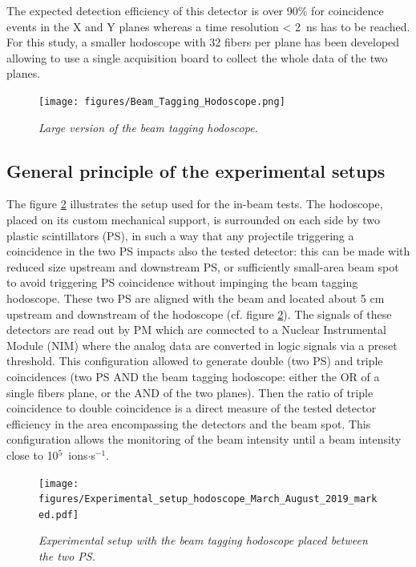 \documentclass[a4paper,11pt]{article}
\begin{document}
The expected detection efficiency of this detector is over 90\% for coincidence events in the X and Y planes whereas a time resolution < 2~ns has to be reached. For this study, a smaller hodoscope with 32 fibers per plane has been developed allowing to use a single acquisition board to collect the whole data of the two planes.

\begin{figure}[H]
\centering
\texttt{[image: figures/Beam\_Tagging\_Hodoscope.png]}
\caption{\small{\textit{Large version of the beam tagging hodoscope.}}}
\label{Hodosocpe}
\end{figure}


\subsection{General principle of the experimental setups}
The figure \ref{fig:Picture_Setup_hodo} illustrates the setup used for the in-beam tests.
The hodoscope, placed on its custom mechanical support, is surrounded on each side by two plastic scintillators (PS), in such a way that any projectile triggering a coincidence in the two PS impacts also the tested detector: this can be made with reduced size upstream and downstream PS, or sufficiently small-area beam spot to avoid triggering PS coincidence without impinging the beam tagging hodoscope. These two PS are aligned with the beam and located about 5 cm upstream and downstream of the hodoscope (cf. figure \ref{fig:Picture_Setup_hodo}). The signals of these detectors are read out by PM which are connected to a Nuclear Instrumental Module (NIM) where the analog data are converted in logic signals via a preset threshold. This configuration allowed to generate double (two PS) and triple coincidences (two PS AND the beam tagging hodoscope: either the OR of a single fibers plane, or the AND of the two planes). Then the ratio of triple coincidence to double coincidence is a direct measure of the tested detector efficiency in the area encompassing the detectors and the beam spot. This configuration allows the monitoring of the beam intensity until a beam intensity close to {10}$^{5}$~ions$\cdot$s$^{-1}$.

\begin{figure}[H]
\centering
\texttt{[image: figures/Experimental\_setup\_hodoscope\_March\_August\_2019\_marked.pdf]}
\caption{\small{\textit{Experimental setup with the beam tagging hodoscope placed between the two PS.}}}
\label{fig:Picture_Setup_hodo}
\end{figure}
\end{document}
